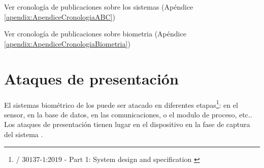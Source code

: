 


\color{red}
Ver cronología de publicaciones sobre los sistemas  (Apéndice \ref{apendix:ApendiceCronologiaABC})

Ver cronología de publicaciones sobre \gls{biometria} (Apéndice  \ref{apendix:ApendiceCronologiaBiometria})
\color{black}

\section{Ataques de presentación}\label{sec:estadoArteAtaquesPresentacion}

El sistemas biométrico de los  puede ser atacado en diferentes etapas\footnote{/ $30137$-$1$:$2019$ -  Part 1: System design and specification \cite{ISO/Biometric}}: en el sensor, en la base de datos, en las comunicaciones, o el modulo de proceso, etc.. Los ataques de presentación tienen lugar en el dispositivo en la fase de captura del sistema \cite{ratha2001enhancing}.

